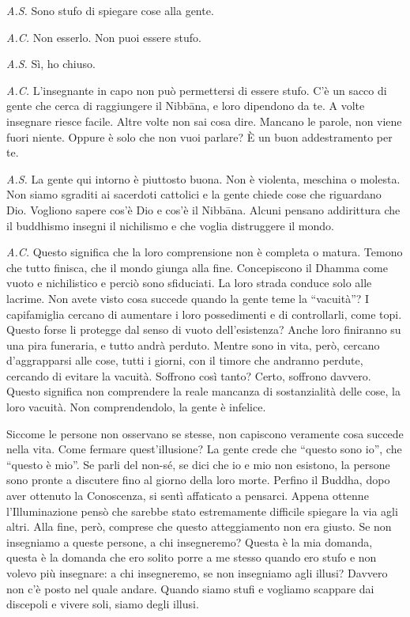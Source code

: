 \emph{A.S.} Sono stufo di spiegare cose alla gente.

\emph{A.C.} Non esserlo. Non puoi essere stufo.

\emph{A.S.} Sì, ho chiuso.

\emph{A.C.} L'insegnante in capo non può permettersi di essere stufo. C'è un
sacco di gente che cerca di raggiungere il Nibbāna, e loro
dipendono da te. A volte insegnare riesce facile. Altre volte non sai
cosa dire. Mancano le parole, non viene fuori niente. Oppure è solo che
non vuoi parlare? È un buon addestramento per te.

\emph{A.S.} La gente qui intorno è piuttosto buona. Non è violenta, meschina o
molesta. Non siamo sgraditi ai sacerdoti cattolici e la gente chiede
cose che riguardano Dio. Vogliono sapere cos'è Dio e cos'è il
Nibbāna. Alcuni pensano addirittura che il buddhismo insegni il
nichilismo e che voglia distruggere il mondo.

\emph{A.C.} Questo significa che la loro comprensione non è completa o matura.
Temono che tutto finisca, che il mondo giunga alla fine. Concepiscono il
Dhamma come vuoto e nichilistico e perciò sono sfiduciati. La loro
strada conduce solo alle lacrime. Non avete visto cosa succede quando la
gente teme la ``vacuità''? I capifamiglia cercano di aumentare i loro
possedimenti e di controllarli, come topi. Questo forse li protegge dal
senso di vuoto dell'esistenza? Anche loro finiranno su una pira
funeraria, e tutto andrà perduto. Mentre sono in vita, però, cercano
d'aggrapparsi alle cose, tutti i giorni, con il timore che andranno
perdute, cercando di evitare la vacuità. Soffrono così tanto? Certo,
soffrono davvero. Questo significa non comprendere la reale mancanza di
sostanzialità delle cose, la loro vacuità. Non comprendendolo, la gente
è infelice.

Siccome le persone non osservano se stesse, non capiscono veramente cosa
succede nella vita. Come fermare quest'illusione? La gente crede che
``questo sono io'', che ``questo è mio''. Se parli del non-sé, se dici
che io e mio non esistono, la persone sono pronte a discutere fino al
giorno della loro morte. Perfino il Buddha, dopo aver ottenuto la
Conoscenza, si sentì affaticato a pensarci. Appena ottenne
l'Illuminazione pensò che sarebbe stato estremamente difficile spiegare
la via agli altri. Alla fine, però, comprese che questo atteggiamento
non era giusto. Se non insegniamo a queste persone, a chi insegneremo?
Questa è la mia domanda, questa è la domanda che ero solito porre a me
stesso quando ero stufo e non volevo più insegnare: a chi insegneremo,
se non insegniamo agli illusi? Davvero non c'è posto nel quale andare.
Quando siamo stufi e vogliamo scappare dai discepoli e vivere soli,
siamo degli illusi.

